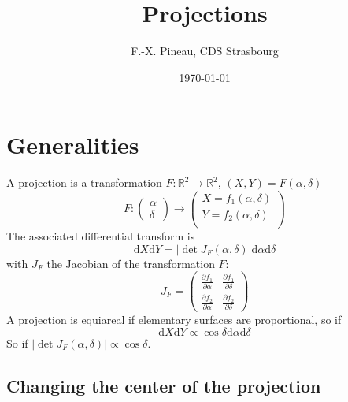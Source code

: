 \documentclass[a4paper,twoside,11pt]{article}
\title{Projections}
\author{F.-X. Pineau, CDS Strasbourg}
\date{\today}
\begin{document}
\maketitle

\tableofcontents \clearpage



\section{Generalities}

  A projection is a transformation 
  $F: \mathbb{R}^2 \to \mathbb{R}^2$,
  $(X, Y) = F(\alpha, \delta)$
  \begin{equation*}
    F:
    \begin{pmatrix}
      \alpha \\
      \delta
    \end{pmatrix}
    \to
    \begin{pmatrix}
      X = f_1(\alpha, \delta) \\
      Y = f_2(\alpha, \delta) \\
    \end{pmatrix}
  \end{equation*}
  The associated differential transform is
  \begin{equation}
    \mathrm{d}X\mathrm{d}Y = |\det J_F(\alpha,\delta)| \mathrm{d}\alpha\mathrm{d}\delta
  \end{equation}
  with $J_F$ the Jacobian of the transformation $F$:
  \begin{equation}
    J_F = 
    \begin{pmatrix}
      \frac{\partial f_1}{\partial \alpha} & \frac{\partial f_1}{\partial \delta} \\
      \frac{\partial f_2}{\partial \alpha} & \frac{\partial f_2}{\partial \delta}
    \end{pmatrix}
  \end{equation}
  A projection is equiareal if elementary surfaces are proportional, so if
  \begin{equation}
    \mathrm{d}X\mathrm{d}Y \propto \cos\delta\mathrm{d}\alpha\mathrm{d}\delta
    \label{eq:equiareal}
  \end{equation}
  So if $|\det J_F(\alpha,\delta)| \propto \cos\delta$.

  \subsection{Changing the center of the projection}
\end{document}
